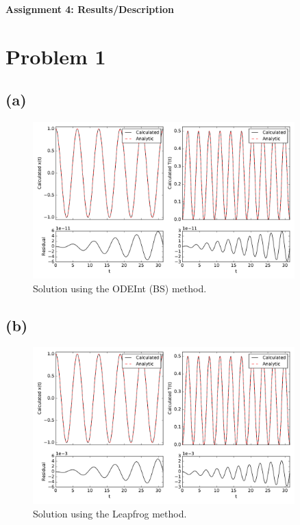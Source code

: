 \documentclass[12pt]{article}
\begin{document}
\begin{center}\begin{LARGE}
\textbf{Assignment 4: Results/Description}
\end{LARGE}\end{center}

\section*{Problem 1}

\subsection*{(a)}



\begin{figure}[ht]
    \centering
    \includegraphics[width=0.9\textwidth]{odeint}
    \caption{Solution using the ODEInt (BS) method.}
    \label{fig:odeint}
\end{figure}

\subsection*{(b)}



\begin{figure}[ht]
    \centering
    \includegraphics[width=0.9\textwidth]{leapfrog}
    \caption{Solution using the Leapfrog method.}
    \label{fig:leapfrog}
\end{figure}
\end{document}
